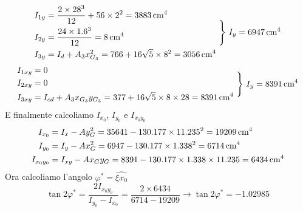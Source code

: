 \begin{equation*}
\begin{aligned}
I_{1y} &= \frac{2\times28^{3}}{12} + 56\times2^2= 3883\,\textup{cm}^4 \\
I_{2y} &= \frac{24\times1.6^{3}}{12} = 8\,\textup{cm}^4 \\
I_{3y} &= I_d+A_{3}x_{G_3}^{2} = 766+16\sqrt{5}\times8^2 = 3056\,\textup{cm}^4 
\end{aligned}
\,\,\Biggr\}\,\, I_y = 6947\,\textup{cm}^4
\end{equation*}
\begin{equation*}
\begin{aligned}
I_{1xy} &= 0 \\
I_{2xy} &= 0 \\
I_{3xy} &= I_{cd}+A_{3}x_{G_3}y_{G_3} = 377 + 16\sqrt{5}\times8\times28 = 8391\,\textup{cm}^4 
\end{aligned}
\,\,\Biggr\}\,\, I_y = 8391\,\textup{cm}^4
\end{equation*}
E finalmente calcoliamo  $I_{x_{0}}$, $I_{y_{0}}$ e $I_{x_{0}y_{0}}$
\begin{align*}
I_{x_{0}} &= I_x - Ay_{G}^{2} = 35641-130.177\times11.235^{2} = 19209\,\textup{cm}^4 \\
I_{y_{0}} &= I_y - Ax_{G}^{2} = 6947-130.177\times1.338^{2} = 6714\,\textup{cm}^4 \\
I_{x_{0}y_{0}} &= I_{xy}-Ax_{G}y_{G} = 8391-130.177\times1.338\times11.235 = 6434\,\textup{cm}^4
\end{align*}
Ora calcoliamo l'angolo $\varphi^{*}=\widehat{\xi x_{0}}$ 
\begin{equation*}
\tan2\varphi^{*}=\frac{2I_{x_{0}y_{0}}}{I_{y_{0}}-I_{x_{0}}} = \frac{2\times6434}{6714-19209} \longrightarrow \tan2\varphi^{*}=-1.02985
\end{equation*}
